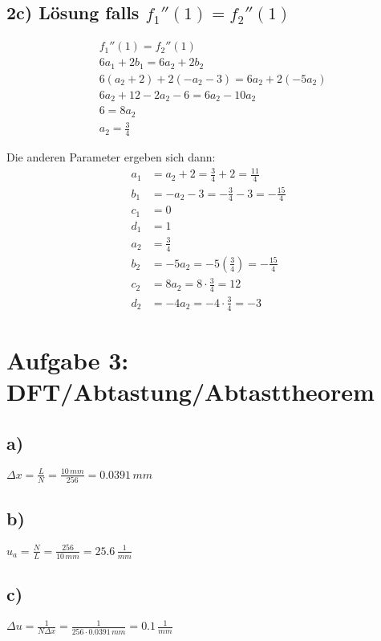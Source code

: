 \documentclass[a4paper,11pt,oneside]{scrartcl}
\begin{document}
\subsection*{2c) Lösung falls $f_1''(1) = f_2''(1)$}
\begin{align*}
&f_1''(1) = f_2''(1)\\
&6a_1 + 2b_1 = 6a_2 + 2b_2\\
&6(a_2 + 2) + 2(-a_2 - 3) = 6a_2 + 2(-5a_2)\\
&6a_2 + 12 -2a_2 -6 = 6a_2 -10a_2\\
&6 = 8a_2\\
&a_2 = \frac{3}{4}
\end{align*}

Die anderen Parameter ergeben sich dann:
\begin{align*}
a_1 &= a_2 + 2 = \frac{3}{4} + 2 = \frac{11}{4}\\
b_1 &= -a_2 - 3 = -\frac{3}{4} - 3 = -\frac{15}{4}\\
c_1 &= 0\\
d_1 &= 1\\
a_2 &= \frac{3}{4}\\
b_2 &= -5a_2 = -5(\frac{3}{4}) = -\frac{15}{4}\\
c_2 &= 8a_2 = 8 \cdot \frac{3}{4} = 12\\
d_2 &= -4a_2 = -4 \cdot \frac{3}{4} = -3
\end{align*}

\newpage

\section*{Aufgabe 3: DFT/Abtastung/Abtasttheorem}
\subsection*{a)}

$\Delta x=\frac{L}{N}=\frac{10\,mm}{256}=0.0391\,mm$

\subsection*{b)}

$u_{a}=\frac{N}{L}=\frac{256}{10\,mm}=25.6\,\frac{1}{mm}$

\subsection*{c)}

$\Delta u=\frac{1}{N\Delta x}=\frac{1}{256\cdot0.0391\,mm}= 0.1\,\frac{1}{mm}$
\end{document}
